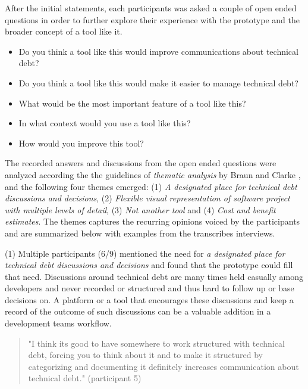 After the initial statements, each participants was asked a couple of open ended questions in order to further explore their experience with the prototype and the broader concept of a tool like it.

\smallskip
\begin{itemize}
  \item Do you think a tool like this would improve communications about technical debt?
  \item Do you think a tool like this would make it easier to manage technical debt?
  \item What would be the most important feature of a tool like this?
  \item In what context would you use a tool like this?
  \item How would you improve this tool?
\end{itemize}
\smallskip

The recorded answers and discussions from the open ended questions were analyzed according the the guidelines of \textit{thematic analysis} by Braun and Clarke \cite{braun_using_2006}, and the following four themes emerged:
(1) \textit{A designated place for technical debt discussions and decisions}, (2) \textit{Flexible visual representation of software project with multiple levels of detail}, (3) \textit{Not another tool} and (4) \textit{Cost and benefit estimates}.
The themes captures the recurring opinions voiced by the participants and are summarized below with examples from the transcribes interviews.

(1) Multiple participants (6/9) mentioned the need for \textit{a designated place for technical debt discussions and decisions} and found that the prototype could fill that need.
Discussions around technical debt are many times held casually among developers and never recorded or structured and thus hard to follow up or base decisions on.
A platform or a tool that encourages these discussions and keep a record of the outcome of such discussions can be a valuable addition in a development teams workflow. 
\begin{quote}
  "I think its good to have somewhere to work structured with technical debt, forcing you to think about it and to make it structured by categorizing and documenting it definitely increases communication about technical debt." (participant 5)
\end{quote}

